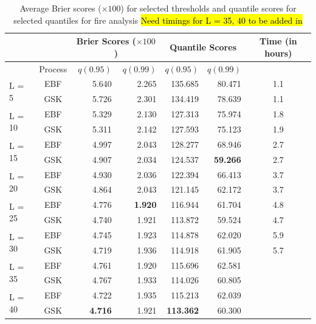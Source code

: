 \documentclass[11pt]{article}
\begin{document}
\begin{table}[htbp]
\caption{Average Brier scores ($\times 100$) for selected thresholds and quantile scores for selected quantiles for fire analysis \hl{Need timings for L = 35, 40 to be added in}}
\label{ebtbl:firescores}
\centering
\small
  \begin{tabular}{lc|rr|rr|c}
  \multicolumn{2}{c}{  }& \multicolumn{2}{|c|}{Brier Scores ($\times 100$)} & \multicolumn{2}{|c|}{Quantile Scores} & Time (in hours)\\
  \hline
  & Process & $q(0.95)$ & $q(0.99)$ & $q(0.95)$ & $q(0.99)$\\
  \hline
  \multirow{2}{*}{L = 5}  & EBF & 5.640 & 2.265 & 135.685 & 80.471 & 1.1\\
                          & GSK & 5.726 & 2.301 & 134.419 & 78.639 & 1.1\\
  \hline
  \multirow{2}{*}{L = 10} & EBF & 5.329 & 2.130 & 127.313 & 75.974 & 1.8\\
                          & GSK & 5.311 & 2.142 & 127.593 & 75.123 & 1.9\\
  \hline
  \multirow{2}{*}{L = 15} & EBF & 4.997 & 2.043 & 128.277 & 68.946 & 2.7\\
                          & GSK & 4.907 & 2.034 & 124.537 & \textbf{59.266} & 2.7\\
  \hline
  \multirow{2}{*}{L = 20} & EBF & 4.930 & 2.036 & 122.394 & 66.413 & 3.7\\
                          & GSK & 4.864 & 2.043 & 121.145 & 62.172 & 3.7\\
  \hline
  \multirow{2}{*}{L = 25} & EBF & 4.776 & \textbf{1.920} & 116.944 & 61.704 & 4.8\\
                          & GSK & 4.740 & 1.921 & 113.872 & 59.524 & 4.7\\
  \hline
  \multirow{2}{*}{L = 30} & EBF & 4.745 & 1.923 & 114.878 & 62.020 & 5.9\\
                          & GSK & 4.719 & 1.936 & 114.918 & 61.905 & 5.7\\
  \hline
  \multirow{2}{*}{L = 35} & EBF & 4.761 & 1.920 & 115.696 & 62.581 & \\
                          & GSK & 4.767 & 1.933 & 114.026 & 60.805 & \\
  \hline
  \multirow{2}{*}{L = 40} & EBF & 4.722 & 1.935 & 115.213 & 62.039 & \\
                          & GSK & \textbf{4.716} & 1.921 & \textbf{113.362} & 60.300 & \\
  \hline
	\end{tabular}
\end{table}
\end{document}
